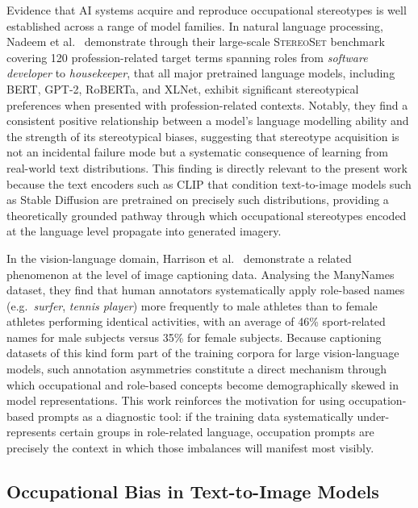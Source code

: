 Evidence that AI systems acquire and reproduce occupational stereotypes is well established
across a range of model families.  In natural language processing, Nadeem et al.\
\cite{Nadeem_2020_StereoSet} demonstrate through their large-scale \textsc{StereoSet}
benchmark covering 120 profession-related target terms spanning roles from
\emph{software developer} to \emph{housekeeper}, that all major pretrained language models,
including BERT, GPT-2, RoBERTa, and XLNet, exhibit significant stereotypical preferences when
presented with profession-related contexts.  Notably, they find a consistent positive
relationship between a model's language modelling ability and the strength of its
stereotypical biases, suggesting that stereotype acquisition is not an incidental failure mode
but a systematic consequence of learning from real-world text distributions.  This finding is
directly relevant to the present work because the text encoders such as CLIP that condition text-to-image
models such as Stable Diffusion are pretrained on precisely such
distributions, providing a theoretically grounded pathway through which occupational
stereotypes encoded at the language level propagate into generated imagery.

In the vision-language domain, Harrison et al.~\cite{Harrison_2023_RunLikeAGirl} demonstrate
a related phenomenon at the level of image captioning data.  Analysing the ManyNames dataset,
they find that human annotators systematically apply role-based names (e.g.\ \emph{surfer},
\emph{tennis player}) more frequently to male athletes than to female athletes performing
identical activities, with an average of 46\% sport-related names for male subjects versus
35\% for female subjects.  Because captioning datasets of this kind form part of the training
corpora for large vision-language models, such annotation asymmetries constitute a direct
mechanism through which occupational and role-based concepts become demographically skewed in
model representations.  This work reinforces the motivation for using occupation-based prompts
as a diagnostic tool: if the training data systematically under-represents certain groups in
role-related language, occupation prompts are precisely the context in which those imbalances
will manifest most visibly.

\subsection{Occupational Bias in Text-to-Image Models}
\label{subsubsec:naik_occupations}

